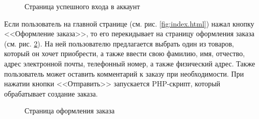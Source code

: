 \documentclass[a4paper, 14pt]{extarticle}
\begin{document}
\begin{figure}[H]
  \centering
  \caption{Страница успешного входа в аккаунт}
  \label{fig:login-success.html}
\end{figure}

Если пользователь на главной странице (см. рис. \ref{fig:index.html}) нажал
кнопку <<Оформление заказа>>, то его перекидывает на страницу оформления заказа
(см. рис. \ref{fig:order.html}). На ней пользователю предлагается выбрать один
из товаров, который он хочет приобрести, а также ввести свою фамилию, имя,
отчество, адрес электронной почты, телефонный номер, а также физический адрес.
Также пользователь может оставить комментарий к заказу при необходимости. При
нажатии кнопки <<Отправить>> запускается PHP-скрипт, который обрабатывает
создание заказа.

\begin{figure}[H]
  \centering
  \caption{Страница оформления заказа}
  \label{fig:order.html}
\end{figure}
\end{document}
